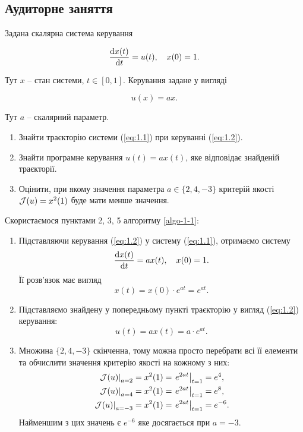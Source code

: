 \subsection{Аудиторне заняття}

\begin{problem}
	Задана скалярна система керування 
	
	\begin{equation}
		\label{eq:1.1}
		\frac{\mathop{}\!\mathrm{d} x(t)}{\mathop{}\!\mathrm{d} t} = u(t), \quad x(0) = 1.
	\end{equation}

	Тут $x$ -- стан системи, $t \in [0, 1]$. Керування задане у вигляді

	\begin{equation}
		\label{eq:1.2}
		u(x) = a x.
	\end{equation}

	Тут $a$ -- скалярний параметр.

	\begin{enumerate}
		\item Знайти траєкторію системи (\ref{eq:1.1}) при керуванні (\ref{eq:1.2}).

		\item Знайти програмне керування $u(t) = a x (t)$, яке відповідає знайденій траєкторії. 

		\item Оцінити, при якому значення параметра $a \in \{2, 4, -3\}$ критерій якості $\mathcal{J}(u) = x^2 (1)$ буде мати менше значення.
	\end{enumerate}
\end{problem}

\begin{solution}
    Скористаємося пунктами 2, 3, 5 алгоритму \ref{algo-1-1}:
    
	\begin{enumerate}
		\item Підставляючи керування (\ref{eq:1.2}) у систему (\ref{eq:1.1}), отримаємо систему \[ \frac{\mathop{}\!\mathrm{d} x(t)}{\mathop{}\!\mathrm{d} t} = a x(t), \quad x(0) = 1. \]
		Її розв'язок має вигляд \[ x(t) = x(0) \cdot e^{a t} = e^{a t}. \]
		\item Підставляємо знайдену у попередньому пункті траєкторію у вигляд (\ref{eq:1.2}) керування: \[ u(t) = a x(t) = a \cdot e^{a t}. \]
		\item Множина $\{2, 4, -3\}$ скінченна, тому можна просто перебрати всі її елементи та обчислити значення критерію якості на кожному з них: \[ \begin{aligned} \left. \mathcal{J} (u) \right|_{a = 2} &= x^2 (1) = \left. e^{2 a t} \right|_{t = 1} = e^4, \\ \left. \mathcal{J} (u) \right|_{a = 4} &= x^2 (1) = \left. e^{2 a t} \right|_{t = 1} = e^8, \\ \left. \mathcal{J} (u) \right|_{a = -3} &= x^2 (1) = \left. e^{2 a t} \right|_{t = 1} = e^{-6}. \end{aligned} \]
		Найменшим з цих значень є $e^{-6}$ яке досягається при $a = -3$.
	\end{enumerate}
\end{solution}


